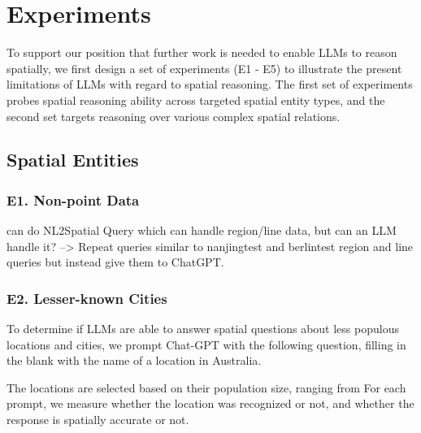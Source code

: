 \section{Experiments}
\label{section:experiments}

To support our position that further work is needed to enable LLMs to reason spatially, we first design a set of experiments (E1 - E5) to illustrate the present limitations of LLMs with regard to spatial reasoning.
The first set of experiments probes spatial reasoning ability across targeted spatial entity types, and the second set targets reasoning over various complex spatial relations.


\subsection{Spatial Entities} %

\subsubsection{E1. Non-point Data}
\cite{Liu2023} can do NL2Spatial Query which can handle region/line data, but can an LLM handle it?
--> Repeat queries similar to \cite{Liu2023} nanjingtest and berlintest region and line queries but instead give them to ChatGPT.

\subsubsection{E2. Lesser-known Cities}
To determine if LLMs are able to answer spatial questions about less populous locations and cities, we prompt Chat-GPT with the following question, filling in the blank with the name of a location in Australia.

\begin{center}
\end{center}

The locations are selected based on their population size, ranging from 
For each prompt, we measure whether the location was recognized or not, and whether the response is spatially accurate or not.







